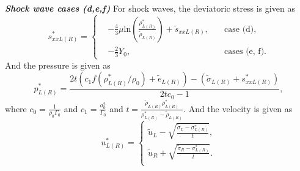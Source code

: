 \documentclass[review]{elsarticle}
\begin{document}
\emph{\textbf{Shock wave cases (d,e,f)}} 
For shock waves, the  deviatoric stress is given as 
\begin{equation}
  s_{xxL(R)}^* = \left\{\begin{aligned}
	  & -\frac{4}{3}\mu\text{ln}\left(\frac{\rho_{L(R)}^*}{\tilde{\rho}_{L(R)}}\right)+\tilde{s}_{xxL(R)},
	\quad  &\text{case (d)},\\
	& -\frac{2}{3}Y_0,   \quad
	&\text{cases (e, f)}.
  \end{aligned} \right.
  \end{equation}
And the pressure is given as
\begin{equation}
  p^*_{L(R)}= 
  \frac{2t(c_1f(\rho^*_{L(R)}/\rho_0)+\tilde{e}_{L(R)})-(\tilde{\sigma}_{L(R)}+{s}_{xxL(R)}^*)}{2tc_0-1},
\end{equation}
where $c_0 = \frac{1}{\rho_0\Gamma_0}$ and $c_1 = \frac{a_0^2}{\Gamma_0}$ and $ t=\frac{\tilde{\rho}_{L(R)} \rho_{L(R)}^*}{\rho_{L(R)}^*-\tilde{\rho}_{L(R)}}$. 
And the velocity is given as
\begin{equation}
  u_{L(R)}^* = \left\{ \begin{array}{l}
	  \tilde{u}_L -\sqrt{\frac{\tilde{\sigma}_L-\sigma_{L(R)}^*}{t}},\\ 
	  \tilde{u}_R +\sqrt{\frac{\tilde{\sigma}_R-\sigma_{L(R)}^*}{t}}.\\
  \end{array}
\right.
\end{equation}
\end{document}
